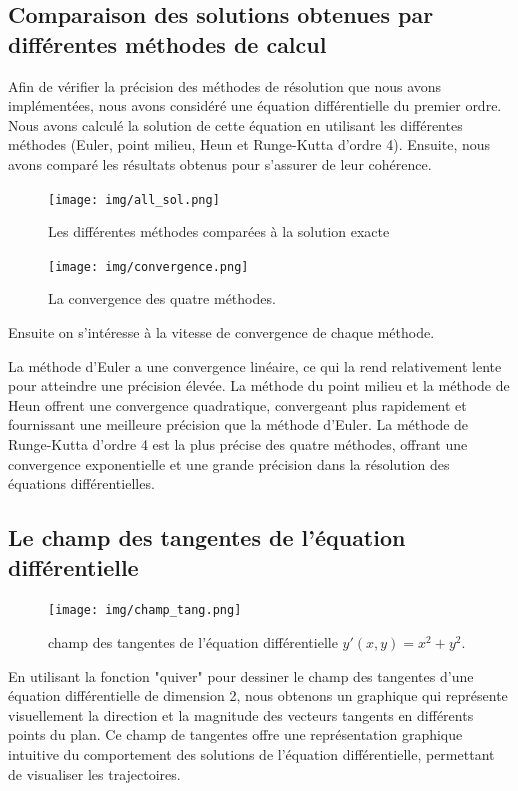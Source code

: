 \documentclass{article}
\begin{document}
\subsection{Comparaison des solutions obtenues par différentes méthodes de calcul}
Afin de vérifier la précision des méthodes de résolution que nous avons implémentées, nous avons considéré une équation différentielle du premier ordre. Nous avons calculé la solution de cette équation en utilisant les différentes méthodes (Euler, point milieu, Heun et Runge-Kutta d'ordre 4). Ensuite, nous avons comparé les résultats obtenus pour s'assurer de leur cohérence.

\begin{figure}[h]
    \begin{minipage}[c]{.4\linewidth}
        \texttt{[image: img/all\_sol.png]}
        \caption{Les différentes méthodes comparées à la solution exacte}
        \label{fig:all}   
    \end{minipage}
    \hfill
    \begin{minipage}[c]{.4\linewidth}
        \texttt{[image: img/convergence.png]}
        \caption{La convergence des quatre méthodes.}
        \label{fig:conv}
    \end{minipage}
\end{figure}

Ensuite on s'intéresse à la vitesse de convergence de chaque méthode.


La méthode d'Euler a une convergence linéaire, ce qui la rend relativement lente pour atteindre une précision élevée. La méthode du point milieu et la méthode de Heun offrent une convergence quadratique, convergeant plus rapidement et fournissant une meilleure précision que la méthode d'Euler. La méthode de Runge-Kutta d'ordre 4 est la plus précise des quatre méthodes, offrant une convergence exponentielle et une grande précision dans la résolution des équations différentielles.

\subsection{Le champ des tangentes de l’équation différentielle}

\begin{figure}[h]
    \centering
    \texttt{[image: img/champ\_tang.png]}
    \caption{ champ des tangentes de l'équation différentielle $y'(x,y)=x^{2}+y^{2}$.}
    \label{fig:champ}
\end{figure}

En utilisant la fonction "quiver" pour dessiner le champ des tangentes d'une équation différentielle de dimension 2, nous obtenons un graphique qui représente visuellement la direction et la magnitude des vecteurs tangents en différents points du plan. Ce champ de tangentes offre une représentation graphique intuitive du comportement des solutions de l'équation différentielle, permettant de visualiser les trajectoires.
\end{document}
